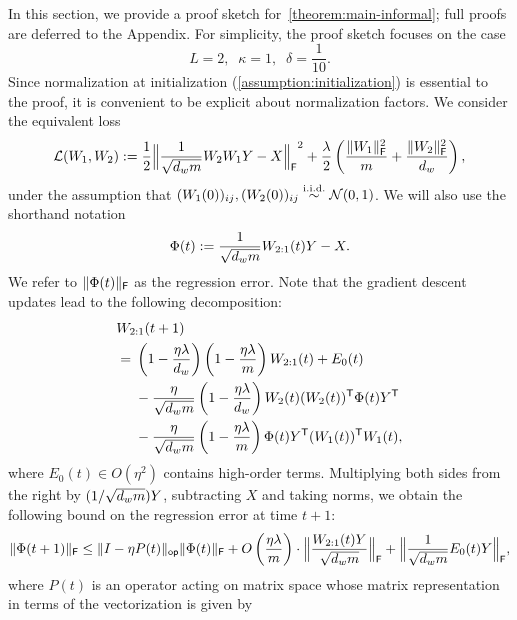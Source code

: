 In this section, we provide a proof sketch for~\cref{theorem:main-informal}; full
proofs are deferred to the Appendix. For simplicity, the proof sketch focuses on the case
\[
	L = 2, \;\; \kappa = 1, \;\; \delta = \frac{1}{10}.
\]
Since normalization at initialization (\cref{assumption:initialization})
is essential to the proof, it is convenient to be explicit about normalization factors. We consider
the equivalent loss
\begin{equation}
	\cL(W_1, W_2) := \frac{1}{2} \frobnorm[\Big]{
		\frac{1}{\sqrt{\dhid \din}} W_{2} W_{1} Y - X
	}^2
	+ \frac{\lambda}{2} \left(
	\frac{\frobnorm{W_1}^2}{\din} + \frac{\frobnorm{W_2}^2}{\dhid}
	\right),
	\label{eq:reformulated-loss}
\end{equation}
under the assumption that $(W_1(0))_{ij}, (W_2(0))_{ij} \overset{\mathrm{i.i.d.}}{\sim} \mathcal{N}(0, 1)$.
We will also use the shorthand notation
\[
	\Phi(t) := \frac{1}{\sqrt{d_{w} m}} W_{2:1}(t) Y - X.
\]
We refer to $\lVert\Phi(t)\rVert_{\mathsf{F}}$ as the regression error.
Note that the gradient descent updates lead to the following decomposition:
\begin{align*}
	 & W_{2:1}(t+1)                                                                                                        \\
	 & = \begin{aligned}[t]
		      & \left(1 - \frac{\eta \lambda}{d_{w}}\right)\left(1 - \frac{\eta \lambda}{m}\right) W_{2:1}(t) + E_0(t) \\
		      & - \frac{\eta}{\sqrt{d_{w} m}}
		     \left(1 - \frac{\eta \lambda}{d_{w}}\right) W_{2}(t) (W_{2}(t))^{\mathsf{T}} \Phi(t) Y^{\mathsf{T}}                          \\
		      & - \frac{\eta}{\sqrt{d_{w} m}}
		     \left(1 - \frac{\eta \lambda}{m}\right) \Phi(t) Y^{\mathsf{T}} (W_{1}(t))^{\mathsf{T}} W_{1}(t),
	     \end{aligned}
\end{align*}
where $E_0(t) \in O(\eta^2)$ contains high-order terms. Multiplying both sides from the right by $(1 / \sqrt{d_{w} m}) Y$, subtracting
$X$ and taking norms, we obtain the following bound on the regression error at time $t+1$:
\begin{align}
	\frobnorm{\Phi(t+1)}
	\leq
	\opnorm{I - \eta P(t)} \frobnorm{\Phi(t)}
	+ O\left(\frac{\eta \lambda}{\din}\right) \cdot \frobnorm[\Big]{\frac{W_{2:1}(t) Y}{\sqrt{\dhid \din}}}
	+ \frobnorm[\Big]{\frac{1}{\sqrt{\dhid \din}} E_0(t) Y},
	\label{eq:proof-sketch-error-decomposition}
\end{align}
where $P(t)$ is an operator acting on matrix space whose matrix representation in terms of the vectorization is given by
